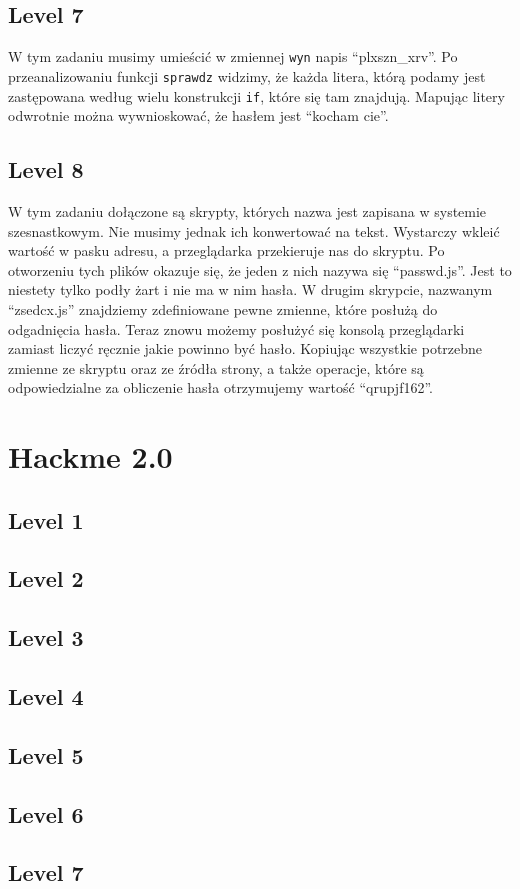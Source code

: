\documentclass[11pt]{article}
\begin{document}
\subsection{Level 7}

W tym zadaniu musimy umieścić w zmiennej \texttt{wyn} napis ``plxszn\_xrv''. Po przeanalizowaniu funkcji \texttt{sprawdz} widzimy, że każda litera, którą podamy jest zastępowana według wielu konstrukcji \texttt{if}, które się tam znajdują. Mapując litery odwrotnie można wywnioskować, że hasłem jest ``kocham cie''.

\subsection{Level 8}

W tym zadaniu dołączone są skrypty, których nazwa jest zapisana w systemie szesnastkowym. Nie musimy jednak ich konwertować na tekst. Wystarczy wkleić wartość w pasku adresu, a przeglądarka przekieruje nas do skryptu. Po otworzeniu tych plików okazuje się, że jeden z nich nazywa się ``passwd.js''. Jest to niestety tylko podły żart i nie ma w nim hasła. W drugim skrypcie, nazwanym ``zsedcx.js'' znajdziemy zdefiniowane pewne zmienne, które posłużą do odgadnięcia hasła. Teraz znowu możemy posłużyć się konsolą przeglądarki zamiast liczyć ręcznie jakie powinno być hasło. Kopiując wszystkie potrzebne zmienne ze skryptu oraz ze źródła strony, a także operacje, które są odpowiedzialne za obliczenie hasła otrzymujemy wartość ``qrupjf162''.

\section{Hackme 2.0}

\subsection{Level 1}

\subsection{Level 2}

\subsection{Level 3}

\subsection{Level 4}

\subsection{Level 5}

\subsection{Level 6}

\subsection{Level 7}
\end{document}
